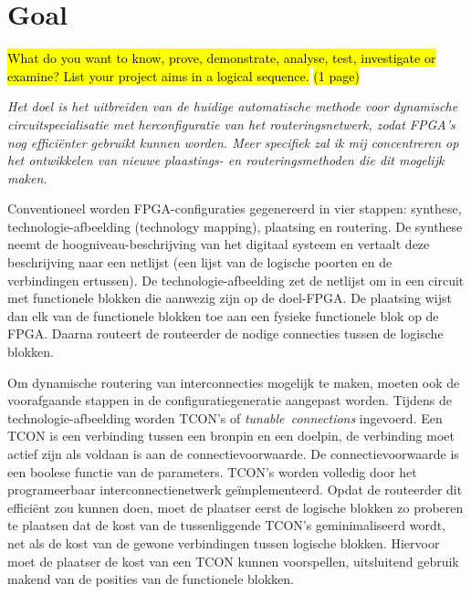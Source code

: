 \documentclass[a4paper,oneside,12pt]{article}
\begin{document}
\newpage

\section{Goal}
\hl{What do you want to know, prove, demonstrate, analyse, test, investigate or examine? List your project aims in a logical sequence.}
\hl{(1 page)}

\emph{Het doel is het uitbreiden van de huidige automatische methode voor dynamische circuitspecialisatie met herconfiguratie van het routeringsnetwerk, zodat FPGA's nog effici\"enter gebruikt kunnen worden. Meer specifiek zal ik mij concentreren op het ontwikkelen van nieuwe plaastings- en routeringsmethoden die dit mogelijk maken.}

Conventioneel worden FPGA-configuraties gegenereerd in vier stappen: synthese, technologie-afbeelding (technology mapping), plaatsing en routering. De synthese neemt de hoogniveau-beschrijving van het digitaal systeem en vertaalt deze beschrijving naar een netlijst (een lijst van de logische poorten en de verbindingen ertussen). De technologie-afbeelding zet de netlijst om in een circuit met functionele blokken die aanwezig zijn op de doel-FPGA. De plaatsing wijst dan elk van de functionele blokken toe aan een fysieke functionele blok op de FPGA. Daarna routeert de routeerder de nodige connecties tussen de logische blokken. 

Om dynamische routering van interconnecties mogelijk te maken, moeten ook de voorafgaande stappen in de configuratiegeneratie aangepast worden. Tijdens de technologie-afbeelding worden TCON's of \mbox{{\em tunable connections}} ingevoerd. Een TCON is een verbinding tussen een bronpin en een doelpin, de verbinding moet actief zijn als voldaan is aan de connectievoorwaarde. De connectievoorwaarde is een boolese functie van de parameters. TCON's worden volledig door het programeerbaar interconnectienetwerk ge\"implementeerd. Opdat de routeerder dit effici\"ent zou kunnen doen, moet de plaatser eerst de logische blokken zo proberen te plaatsen dat de kost van de tussenliggende TCON's geminimaliseerd wordt, net als de kost van de gewone verbindingen tussen logische blokken. Hiervoor moet de plaatser de kost van een TCON kunnen voorspellen, uitsluitend gebruik makend van de posities van de functionele blokken.
\end{document}

